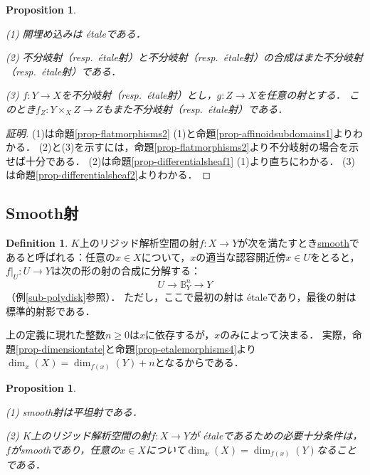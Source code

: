 \documentclass[a4paper,12pt, dvipdfmx]{jsbook}
\def\B{\mathbb{B}}
\theoremstyle{plain}
\newtheorem{prop}[thm]{\bfseries Proposition}
\theoremstyle{definition}
\newtheorem{dfn}[thm]{\bfseries Definition}
\begin{document}
\begin{prop}\label{prop-etalemorphisms2}{\rm 
(1) 開埋め込みは \'etaleである．

(2) 不分岐射（resp.\ \'etale射）と不分岐射（resp.\ \'etale射）の合成はまた不分岐射（resp.\ \'etale射）である．

(3) $f\colon Y\rightarrow X$を不分岐射（resp.\ \'etale射）とし，$g\colon Z\rightarrow X$を任意の射とする．
このとき$f_Z\colon Y\times_XZ\rightarrow Z$もまた不分岐射（resp.\ \'etale射）である．}
\end{prop}

\begin{proof}[証明]
(1)は命題\ref{prop-flatmorphisms2} (1)と命題\ref{prop-affinoidsubdomains1}よりわかる．
(2)と(3)を示すには，命題\ref{prop-flatmorphisms2}より不分岐射の場合を示せば十分である．
(2)は命題\ref{prop-differentialsheaf1} (1)より直ちにわかる．
(3)は命題\ref{prop-differentialsheaf2}よりわかる．
\end{proof}

\subsection{Smooth射}\label{sub-smoothmorphisms}
\begin{dfn}\label{dfn-smoothmorphisms}{\rm 
$K$上のリジッド解析空間の射$f\colon X\rightarrow Y$が次を満たすとき\underline{smooth}であると呼ばれる：任意の$x\in X$について，$x$の適当な認容開近傍$x\in U$をとると，$f|_U\colon U\rightarrow Y$は次の形の射の合成に分解する：
$$
U\longrightarrow\B^n_Y\longrightarrow Y
$$
（例\ref{sub-polydisk}参照）．
ただし，ここで最初の射は \'etaleであり，最後の射は標準的射影である．}
\end{dfn}

上の定義に現れた整数$n\geq 0$は$x$に依存するが，$x$のみによって決まる．
実際，命題\ref{prop-dimensiontate}と命題\ref{prop-etalemorphisms4}より$\dim_x(X)=\dim_{f(x)}(Y)+n$となるからである．
\begin{prop}\label{prop-smoothmorphisms}{\rm 
(1) smooth射は平坦射である．

(2) $K$上のリジッド解析空間の射$f\colon X\rightarrow Y$が \'etaleであるための必要十分条件は，$f$がsmoothであり，任意の$x\in X$について$\dim_x(X)=\dim_{f(x)}(Y)$なることである．}
\end{prop}
\end{document}
